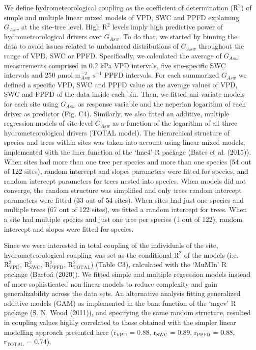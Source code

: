 \documentclass[11pt,twoside]{reedthesis}
\begin{document}
We define hydrometeorological coupling as the coefficient of
determination (\(\text{R}^2\)) of simple and multiple linear mixed
models of VPD, SWC and PPFD explaining \(G_{Asw}\) at the site-tree
level. High \(\text{R}^2\) levels imply high predictive power of
hydrometeorological drivers over \(G_{Asw}\). To do that, we started by
binning the data to avoid issues related to unbalanced distributions of
\(G_{Asw}\) throughout the range of VPD, SWC or PPFD. Specifically, we
calculated the average of \(G_{Asw}\) measurements comprised in 0.2 kPa
VPD intervals, five site-specific SWC intervals and 250 \(\mu\)mol
\(\text{m}^{-2}_{Asw}\) \(\text{s}^{-1}\) PPFD intervals. For each
summarized \(G_{Asw}\) we defined a specific VPD, SWC and PPFD value as
the average values of VPD, SWC and PPFD of the data inside each bin.
Then, we fitted uni-variate models for each site using \(G_{Asw}\) as
response variable and the neperian logarithm of each driver as predictor
(Fig. C4). Similarly, we also fitted an additive, multiple regression
models of site-level \(G_{Asw}\) as a function of the logarithm of all
three hydrometeorological drivers (TOTAL model). The hierarchical
structure of species and trees within sites was taken into account using
linear mixed models, implemented with the lmer function of the `lme4' R
package (Bates et al. (2015)). When sites had more than one tree per
species and more than one species (54 out of 122 sites), random
intercept and slopes parameters were fitted for species, and random
intercept parameters for trees nested into species. When models did not
converge, the random structure was simplified and only trees random
intercept parameters were fitted (33 out of 54 sites). When sites had
just one species and multiple trees (67 out of 122 sites), we fitted a
random intercept for trees. When a site had multiple species and just
one tree per species (1 out of 122), random intercept and slopes were
fitted for species.\par

Since we were interested in total coupling of the individuals of the
site, hydrometeorological coupling was set as the conditional
\(\text{R}^2\) of the models (i.e. \(\text{R}^2_{\text{VPD}}\),
\(\text{R}^2_{\text{SWC}}\), \(\text{R}^2_{\text{PPFD}}\),
\(\text{R}^2_{\text{TOTAL}}\)) (Table C3), calculated with the `MuMIn' R
package (Bartoń (2020)). We fitted simple and multiple regression models
instead of more sophisticated non-linear models to reduce complexity and
gain generalizability across the data sets. An alternative analysis
fitting generalized additive models (GAM) as implemented in the bam
function of the `mgcv' R package (S. N. Wood (2011)), and specifying the
same random structure, resulted in coupling values highly correlated to
those obtained with the simpler linear modelling approach presented here
(\(\text{r}_{\text{VPD}}\) = 0.88, \(\text{r}_{\text{SWC}}\) = 0.89,
\(\text{r}_{\text{PPFD}}\) = 0.88, \(\text{r}_{\text{TOTAL}}\) =
0.74).\par
\end{document}
